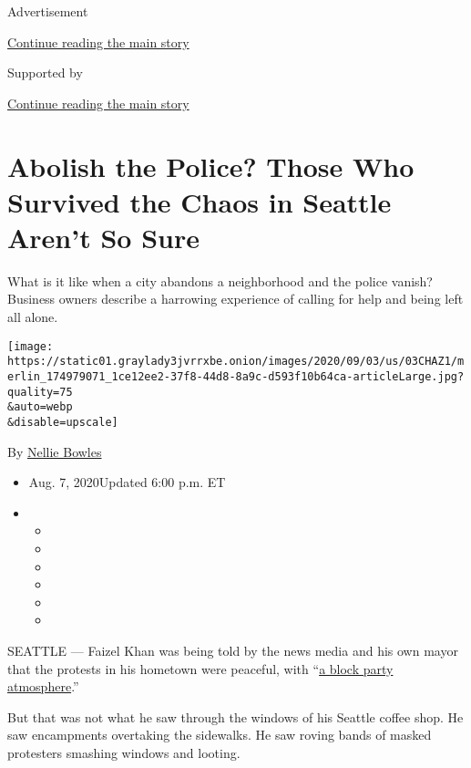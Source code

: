 Advertisement

\protect\hyperlink{after-top}{Continue reading the main story}

Supported by

\protect\hyperlink{after-sponsor}{Continue reading the main story}

\hypertarget{abolish-the-police-those-who-survived-the-chaos-in-seattle-arent-so-sure}{%
\section{Abolish the Police? Those Who Survived the Chaos in Seattle
Aren't So
Sure}\label{abolish-the-police-those-who-survived-the-chaos-in-seattle-arent-so-sure}}

What is it like when a city abandons a neighborhood and the police
vanish? Business owners describe a harrowing experience of calling for
help and being left all alone.

\texttt{[image: https://static01.graylady3jvrrxbe.onion/images/2020/09/03/us/03CHAZ1/merlin\_174979071\_1ce12ee2-37f8-44d8-8a9c-d593f10b64ca-articleLarge.jpg?quality=75\\\&auto=webp\\\&disable=upscale]}

By \href{https://www.nytimes3xbfgragh.onion/by/nellie-bowles}{Nellie
Bowles}

\begin{itemize}
\item
  Aug. 7, 2020Updated 6:00 p.m. ET
\item
  \begin{itemize}
  \item
  \item
  \item
  \item
  \item
  \item
  \end{itemize}
\end{itemize}

SEATTLE --- Faizel Khan was being told by the news media and his own
mayor that the protests in his hometown were peaceful, with
``\href{https://www.realclearpolitics.com/video/2020/06/12/seattle_mayor_durkan_chaz_has_a_block_party_atmosphere_could_turn_into_summer_of_love.html}{a
block party atmosphere}.''

But that was not what he saw through the windows of his Seattle coffee
shop. He saw encampments overtaking the sidewalks. He saw roving bands
of masked protesters smashing windows and looting.

